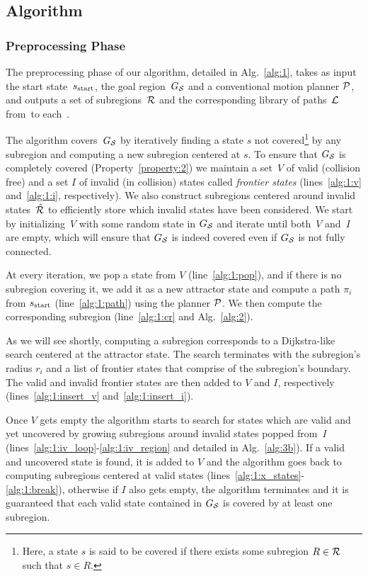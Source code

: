 \documentclass[a4paper]{report}
\begin{document}
\subsection{Algorithm}
\label{subsec:alg}
\subsubsection{Preprocessing Phase}
The preprocessing phase of our algorithm, detailed in Alg.~\ref{alg:1}, takes as input the start state~$s_{\textrm{start}}$, the goal region~$G_\mathcal{S}$ and a conventional motion planner $\mathcal{P}$, and outputs a set of subregions~$\mathcal{R}$ and the corresponding library of paths~$\mathcal{L}$ from~\Sstart to each~\sAttract. 

The algorithm covers~$G_\mathcal{S}$ by iteratively finding a state $s$ not covered\footnote{Here, a state $s$ is said to be covered if there exists some subregion $R \in \mathcal{R}$ such that $s \in R$.} by any subregion and computing a new subregion centered at $s$.
To ensure that $G_\mathcal{S}$ is completely covered (Property~\ref{property:2}) we maintain a set~$V$ of valid (collision free) and a set $I$ of invalid (in collision) states called \emph{frontier states} (lines~\ref{alg:1:v} and~\ref{alg:1:i}, respectively).
We also construct subregions centered around invalid states~$\hat{\mathcal{R}}$ to efficiently store which invalid states have been considered.
We start by initializing~$V$ with some random state in $G_\mathcal{S}$ and iterate until both~$V$ and~$I$ are empty, which will ensure that $G_\mathcal{S}$ is indeed covered even if $G_\mathcal{S}$ is not fully connected.

At every iteration, we pop a state from $V$ (line~\ref{alg:1:pop}), and if there is no subregion covering it, we add it as a new attractor state and compute a path $\pi_i$ from $s_{\textrm{start}}$ (line~\ref{alg:1:path}) using the planner $\mathcal{P}$.
We then compute the corresponding subregion (line~\ref{alg:1:cr} and Alg.~\ref{alg:2}).

As we will see shortly, computing a subregion corresponds to a Dijkstra-like search centered at the attractor state.
The search terminates with the subregion's radius $r_i$ and a list of frontier states that comprise of the subregion's boundary.
The valid and invalid frontier states are then added to $V$ and $I$, respectively (lines~\ref{alg:1:insert_v} and~\ref{alg:1:insert_i}).


Once $V$ gets empty the algorithm starts to search for states which are valid and yet uncovered by growing subregions around invalid states popped from~$I$ (lines~\ref{alg:1:iv_loop}-\ref{alg:1:iv_region} and detailed in Alg.~\ref{alg:3b}). If a valid and uncovered state is found, it is added to $V$ and the algorithm goes back to computing subregions centered at valid states (lines~\ref{alg:1:x_states}-\ref{alg:1:break}), otherwise if $I$ also gets empty, the algorithm terminates and it is guaranteed that each valid state contained in $G_\mathcal{S}$ is covered by at least one subregion.
\end{document}
